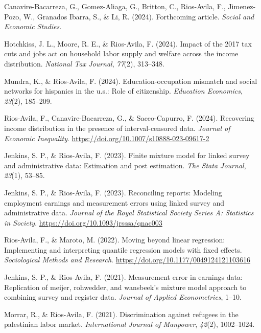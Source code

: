 \documentclass[
  letterpaper,
]{moderncv}
\newlength{\cslhangindent}
\newenvironment{CSLReferences}[2] %
 {\begin{list}{}{%
  \setlength{\itemindent}{0pt}
  \setlength{\leftmargin}{0pt}
  \setlength{\parsep}{0pt}
  \ifodd #1
   \setlength{\leftmargin}{\cslhangindent}
   \setlength{\itemindent}{-1\cslhangindent}
  \fi
  \setlength{\itemsep}{#2\baselineskip}}}
 {\end{list}}
\begin{document}
\label{refs}
\begin{CSLReferences}{1}{0}
Canavire-Bacarreza, G., Gomez-Aliaga, G., Britton, C., Rios-Avila, F.,
Jimenez-Pozo, W., Granados Ibarra, S., \& Li, R. (2024). Forthcoming
article. \emph{Social and Economic Studies}.

Hotchkiss, J. L., Moore, R. E., \& Rios-Avila, F. (2024). Impact of the
2017 tax cuts and jobs act on household labor supply and welfare across
the income distribution. \emph{National Tax Journal}, \emph{77}(2),
313--348.

Mundra, K., \& Rios-Avila, F. (2024). Education-occupation mismatch and
social networks for hispanics in the u.s.: Role of citizenship.
\emph{Education Economics}, \emph{23}(2), 185--209.

Rios-Avila, F., Canavire-Bacarreza, G., \& Sacco-Capurro, F. (2024).
Recovering income distribution in the presence of interval-censored
data. \emph{Journal of Economic Inequality}.
\url{https://doi.org/10.1007/s10888-023-09617-2}

Jenkins, S. P., \& Rios-Avila, F. (2023). Finite mixture model for
linked survey and administrative data: Estimation and post estimation.
\emph{The Stata Journal}, \emph{23}(1), 53--85.

Jenkins, S. P., \& Rios-Avila, F. (2023). Reconciling reports: Modeling
employment earnings and measurement errors using linked survey and
administrative data. \emph{Journal of the Royal Statistical Society
Series A: Statistics in Society}.
\url{https://doi.org/10.1093/jrsssa/qnac003}

Rios-Avila, F., \& Maroto, M. (2022). Moving beyond linear regression:
Implementing and interpreting quantile regression models with fixed
effects. \emph{Sociological Methods and Research}.
\url{https://doi.org/10.1177/0049124121103616}

Jenkins, S. P., \& Rios-Avila, F. (2021). Measurement error in earnings
data: Replication of meijer, rohwedder, and wansbeek's mixture model
approach to combining survey and register data. \emph{Journal of Applied
Econometrics}, 1--10.

Morrar, R., \& Rios-Avila, F. (2021). Discrimination against refugees in
the palestinian labor market. \emph{International Journal of Manpower},
\emph{42}(2), 1002--1024.


\end{CSLReferences}
\end{document}
